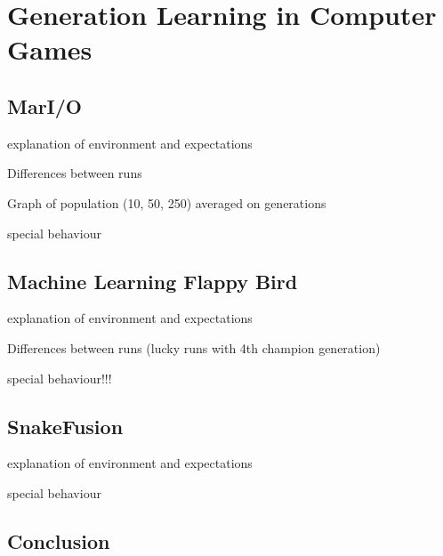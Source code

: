 %
\chapter{Generation Learning in Computer Games}
\label{sec:analysis}

\section{MarI/O}
\label{sec:analysis:mario}

explanation of environment and expectations

Differences between runs 

Graph of population (10, 50, 250) averaged on generations

special behaviour


\section{Machine Learning Flappy Bird}
\label{sec:analysis:flappy}

explanation of environment and expectations

Differences between runs (lucky runs with 4th champion generation)

special behaviour!!!

\section{SnakeFusion}
\label{sec:analysis:flappy}

explanation of environment and expectations

special behaviour


\section{Conclusion}
\label{sec:system:conclusion}
